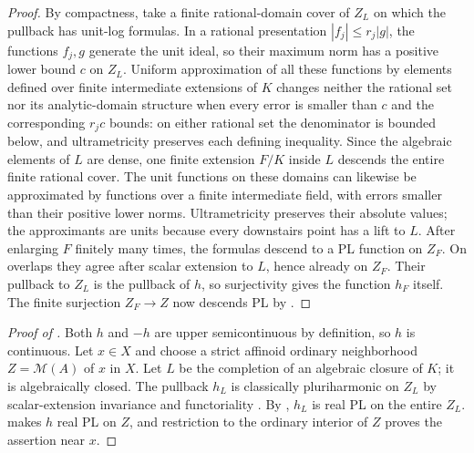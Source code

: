 \documentclass[11pt,a4paper]{amsart}
\begin{document}
\begin{proof}
By compactness, take a finite rational-domain cover of $Z_L$ on which the pullback has unit-log formulas. In a rational presentation $|f_j|\leq r_j|g|$, the functions $f_j,g$ generate the unit ideal, so their maximum norm has a positive lower bound $c$ on $Z_L$. Uniform approximation of all these functions by elements defined over finite intermediate extensions of $K$ changes neither the rational set nor its analytic-domain structure when every error is smaller than $c$ and the corresponding $r_jc$ bounds: on either rational set the denominator is bounded below, and ultrametricity preserves each defining inequality. Since the algebraic elements of $L$ are dense, one finite extension $F/K$ inside $L$ descends the entire finite rational cover. The unit functions on these domains can likewise be approximated by functions over a finite intermediate field, with errors smaller than their positive lower norms. Ultrametricity preserves their absolute values; the approximants are units because every downstairs point has a lift to $L$. After enlarging $F$ finitely many times, the formulas descend to a PL function on $Z_F$. On overlaps they agree after scalar extension to $L$, hence already on $Z_F$. Their pullback to $Z_L$ is the pullback of $h$, so surjectivity gives the function $h_F$ itself. The finite surjection $Z_F\to Z$ now descends PL by .
\end{proof}

\begin{proof}[Proof of ]
Both $h$ and $-h$ are upper semicontinuous by definition, so $h$ is continuous. Let $x\in X$ and choose a strict affinoid ordinary neighborhood $Z=\mathcal M(A)$ of $x$ in $X$. Let $L$ be the completion of an algebraic closure of $K$; it is algebraically closed. The pullback $h_L$ is classically pluriharmonic on $Z_L$ by scalar-extension invariance and functoriality \cite[Proposition~7.2(6)--(7)]{GR25Classical}. By , $h_L$ is real PL on the entire $Z_L$.  makes $h$ real PL on $Z$, and restriction to the ordinary interior of $Z$ proves the assertion near $x$.
\end{proof}

\printbibliography
\end{document}
